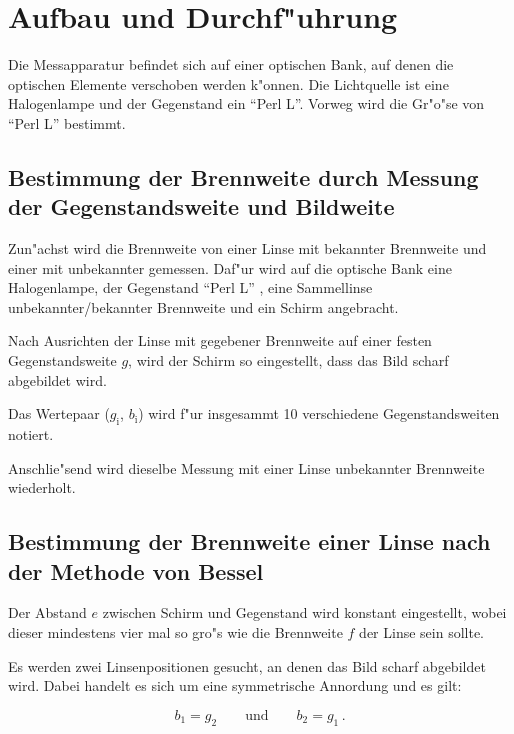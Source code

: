 \section{Aufbau und Durchf"uhrung}
	\label{sec:durchfuehrung}

	Die Messapparatur befindet sich auf einer optischen Bank, auf denen die optischen Elemente verschoben werden k"onnen.
	Die Lichtquelle ist eine Halogenlampe und der Gegenstand ein "`Perl L"'.
	Vorweg wird die Gr"o"se von "`Perl L"' bestimmt.

	\subsection{Bestimmung der Brennweite durch Messung der Gegenstandsweite und Bildweite} %
		\label{sub:bestimmung_der_brennweite_durch_messung_der_gegenstandsweite_und_bildweite}
		
		Zun"achst wird die Brennweite von einer Linse mit bekannter Brennweite und einer mit unbekannter gemessen.
		Daf"ur wird auf die optische Bank eine Halogenlampe, der Gegenstand "`Perl L"' , eine Sammellinse unbekannter/bekannter Brennweite und ein Schirm angebracht.

		Nach Ausrichten der Linse mit gegebener Brennweite auf einer festen Gegenstandsweite $g$, wird der Schirm so eingestellt, dass das Bild scharf abgebildet wird.

		Das Wertepaar ($g_\mathrm{i}$, $b_\mathrm{i}$) wird f"ur insgesammt 10 verschiedene Gegenstandsweiten notiert.

		Anschlie"send wird dieselbe Messung mit einer Linse unbekannter Brennweite wiederholt.

	\subsection{Bestimmung der Brennweite einer Linse nach der Methode von Bessel} %
		\label{sub:bestimmung_der_brennweite_einer_linse_nach_der_methode_von_bessel}
		
		Der Abstand $e$ zwischen Schirm und Gegenstand wird konstant eingestellt, wobei dieser mindestens vier mal so gro"s wie die Brennweite $f$ der Linse sein sollte.

		Es werden zwei Linsenpositionen gesucht, an denen das Bild scharf abgebildet wird. Dabei handelt es sich um eine symmetrische Annordung und es gilt:

		\begin{equation}
			b_1 = g_2 \qquad \text{und} \qquad b_2 = g_1\, . \nonumber
		\end{equation}

